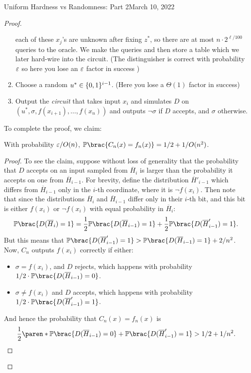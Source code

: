 \begin{lecture}{8}{Uniform Hardness vs Randomness: Part 2}{March 10, 2022}
\begin{proof}
\begin{enumerate}
		each of these $x_j$'s are unknown after fixing $z^*$, so there
		are at most $n \cdot 2^{\ell / 100}$ queries to the oracle. We make the queries and then store a table which we later hard-wire into the circuit. (The distinguisher is correct with probability $\varepsilon$ so here you lose an $\varepsilon$ factor in success )
		\item Choose a random $u^* \in \{0, 1\}^{i - 1}$. (Here you lose a $\Theta(1)$ factor in success)
		\item Output the \emph{circuit} that takes input $x_i$ and simulates
		$D$ on $(u^*, \sigma, f(x_{i + 1}), \ldots , f(x_n))$ and outputs
		$\lnot \sigma$ if $D$ accepts, and $\sigma$ otherwise. 
	\end{enumerate}
	To complete the proof, we claim:
	
	\begin{claim}
		With probability $\varepsilon / O(n)$, $\Pr\brac{C_n(x) = f_n(x)} = 1/2 + 1/O(n^2)$.
	\end{claim}
	\begin{proof}
	To see the claim, suppose without loss of generality that the probability
	that $D$ accepts on an input sampled from $\overline{H}_{i}$ is larger
	than the probability it accepts on one from $\overline{H}_{i - 1}$.
	For brevity, define the distribution $\overline{H}'_{i - 1}$ which differs
	from $\overline{H}_{i - 1}$ only in the $i$-th coordinate, where it is
	$\lnot f(x_i)$.
	Then note that since the distributions $\overline{H}_i$ and
	$\overline{H}_{i - 1}$ differ only in their $i$-th bit, and this bit is
	either $f(x_i)$ or $\lnot f(x_i)$ with equal probability in
	$\overline{H}_i$:
	\[
	\Pr\brac{D(\overline{H}_{i}) = 1}
	= \frac 12 \Pr\brac{D(\overline{H}_{i - 1}) = 1}
	+ \frac 12 \Pr\brac{D(\overline{H}'_{i - 1}) = 1}.
	\]
	But this means that $\Pr\brac{D(\overline{H}'_{i - 1}) = 1} >
	\Pr\brac{D(\overline{H}_{i - 1}) = 1} + 2/n^2$.
	Now, $C_n$ outputs $f(x_i)$ correctly if either:
	\begin{itemize}
		\item $\sigma = f(x_i)$, and $D$ rejects, which happens with
		probability $1/2 \cdot \Pr\brac{D(\overline{H}_{i - 1}) = 0}$.
		\item $\sigma \neq f(x_i)$ and $D$ accepts, which happens with
		probability $1/2 \cdot \Pr\brac{D(\overline{H}'_{i - 1}) = 1}$.
	\end{itemize}
	And hence the probability that $C_n(x) = f_n(x)$ is
	\[
	\frac 12 \paren*{
		\Pr\brac{D(\overline{H}_{i - 1}) = 0} +
		\Pr\brac{D(\overline{H}'_{i - 1}) = 1}
	}
	> 1/2 + 1/n^2. \qedhere
	\]
	\end{proof}
	

\end{proof}
\end{lecture}
